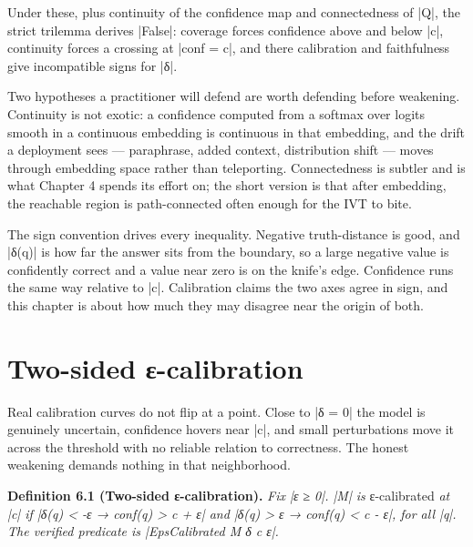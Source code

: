\documentclass{memoir}
\begin{document}
Under these, plus continuity of the confidence map and connectedness of \LeanVerb|Q|, the
strict trilemma derives \LeanVerb|False|: coverage forces confidence above and below \LeanVerb|c|,
continuity forces a crossing at \LeanVerb|conf = c|, and there calibration and
faithfulness give incompatible signs for \LeanVerb|δ|.

Two hypotheses a practitioner will defend are worth defending before weakening.
Continuity is not exotic: a confidence computed from a softmax over logits
smooth in a continuous embedding is continuous in that embedding, and the drift
a deployment sees — paraphrase, added context, distribution shift — moves
through embedding space rather than teleporting. Connectedness is subtler and is
what Chapter 4 spends its effort on; the short version is that after embedding,
the reachable region is path-connected often enough for the IVT to bite.

The sign convention drives every inequality. Negative truth-distance is good,
and \LeanVerb|δ(q)| is how far the answer sits from the boundary, so a large negative
value is confidently correct and a value near zero is on the knife's edge.
Confidence runs the same way relative to \LeanVerb|c|. Calibration claims the two axes
agree in sign, and this chapter is about how much they may disagree near the
origin of both.



\section{Two-sided ε-calibration}\label{Two--Schemas--of--Impossibility-005F-005F-005F--Machine--Checked--Limits--of--Trustworthy--Machine--Learning-005F-005F-005F--and--Why--They--Tighten--with--Capability----Approximate--Bridges--to--Real--Models----Two--sided---005F-005F-005F--calibration}

Real calibration curves do not flip at a point. Close to \LeanVerb|δ = 0| the model is
genuinely uncertain, confidence hovers near \LeanVerb|c|, and small perturbations move it
across the threshold with no reliable relation to correctness. The honest
weakening demands nothing in that neighborhood.

\textbf{Definition 6.1 (Two-sided ε-calibration).} \emph{Fix \LeanVerb|ε ≥ 0|. \LeanVerb|M| is} ε-calibrated \emph{at
\LeanVerb|c| if \LeanVerb|δ(q) < -ε → conf(q) > c + ε| and \LeanVerb|δ(q) > ε → conf(q) < c - ε|, for all
\LeanVerb|q|. The verified predicate is \LeanVerb|EpsCalibrated M δ c ε|.}
\end{document}
